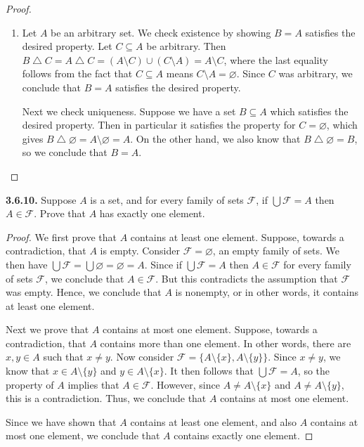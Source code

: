 \documentclass[12pt]{amsart}
\newenvironment{statement}[1]{\smallskip\noindent\color[rgb]{.6627, .3529, .6314} {\bf #1.}}{}
\theoremstyle{definition}
\theoremstyle{remark}
\begin{document}
\begin{proof}
\begin{enumerate}
	\item Let $A$ be an arbitrary set.
	We check existence by showing $B = A$ satisfies the desired property.
	Let $C \subseteq A$ be arbitrary.
	Then $B \bigtriangleup C = A \bigtriangleup C = (A \setminus C) \cup (C \setminus A) = 
	A \setminus C$, where the last equality follows from the fact that $C \subseteq A$ means
	$C \setminus A = \varnothing$.
	Since $C$ was arbitrary, we conclude that $B = A$ satisfies the desired property.
	
	Next we check uniqueness.
	Suppose we have a set $B \subseteq A$ which satisfies the desired property.
	Then in particular it satisfies the property for $C = \varnothing$, which gives
	$B \bigtriangleup \varnothing = A \setminus \varnothing = A$.
	On the other hand, we also know that $B \bigtriangleup \varnothing = B$, 
	so we conclude that $B = A$.
\end{enumerate}
\end{proof}


\begin{statement}{3.6.10}
Suppose $A$ is a set, and for every family of sets $\mathcal{F}$, if $\bigcup \mathcal{F} = A$ then $A \in \mathcal{F}$.
Prove that $A$ has exactly one element.
\end{statement}

\begin{proof}
We first prove that $A$ contains at least one element.
Suppose, towards a contradiction, that $A$ is empty.
Consider $\mathcal{F} = \varnothing$, an empty family of sets.
We then have $\bigcup \mathcal{F} = \bigcup \varnothing = \varnothing = A$.
Since if $\bigcup \mathcal{F} = A$ then $A \in \mathcal{F}$ for every family of sets $\mathcal{F}$, we conclude that $A \in \mathcal{F}$.
But this contradicts the assumption that $\mathcal{F}$ was empty.
Hence, we conclude that $A$ is nonempty, or in other words, it contains at least one element.

Next we prove that $A$ contains at most one element.
Suppose, towards a contradiction, that $A$ contains more than one element.
In other words, there are $x, y \in A$ such that $x \neq y$.
Now consider $\mathcal{F} = \{ A \setminus \{ x \}, A \setminus \{ y \} \}$.
Since $x \neq y$, we know that $x \in A \setminus \{ y \}$ and $y \in A \setminus \{ x \}$.
It then follows that $\bigcup \mathcal{F} = A$, so the property of $A$ implies that $A \in \mathcal{F}$.
However, since $A \neq A \setminus \{ x \}$ and $A \neq A \setminus \{ y \}$, this is a contradiction.
Thus, we conclude that $A$ contains at most one element.

Since we have shown that $A$ contains at least one element, and also $A$ contains at most one element, we conclude that $A$ contains exactly one element.
\end{proof}
\end{document}
